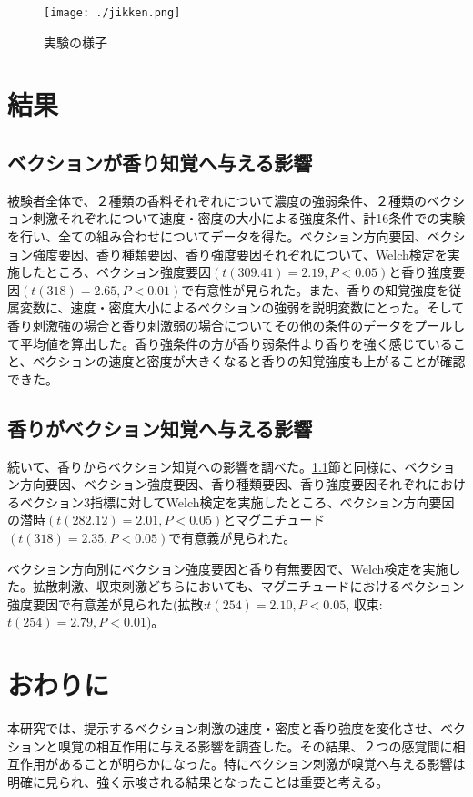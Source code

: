 \documentclass[uplatex]{jsarticle}   %
\begin{document}
\begin{figure}[htbp]
 \centering
 \texttt{[image: ./jikken.png]}
 \caption{実験の様子}\label{fig:jikken}
\end{figure}

\section{結果}
\subsection{ベクションが香り知覚へ与える影響}
\label{ベクションが香り知覚へ与える影響}
被験者全体で、２種類の香料それぞれについて濃度の強弱条件、２種類のベクション刺激それぞれについて速度・密度の大小による強度条件、計16条件での実験を行い、全ての組み合わせについてデータを得た。ベクション方向要因、ベクション強度要因、香り種類要因、香り強度要因それぞれについて、Welch検定を実施したところ、ベクション強度要因$(t(309.41)=2.19, P < 0.05)$と香り強度要因$(t(318)=2.65, P < 0.01)$で有意性が見られた。また、香りの知覚強度を従属変数に、速度・密度大小によるベクションの強弱を説明変数にとった。そして香り刺激強の場合と香り刺激弱の場合についてその他の条件のデータをプールして平均値を算出した。香り強条件の方が香り弱条件より香りを強く感じていること、ベクションの速度と密度が大きくなると香りの知覚強度も上がることが確認できた。

\subsection{香りがベクション知覚へ与える影響}
続いて、香りからベクション知覚への影響を調べた。\ref{ベクションが香り知覚へ与える影響}節と同様に、ベクション方向要因、ベクション強度要因、香り種類要因、香り強度要因それぞれにおけるベクション3指標に対してWelch検定を実施したところ、ベクション方向要因の潜時$(t(282.12)=2.01, P < 0.05)$とマグニチュード$(t(318)=2.35, P < 0.05)$で有意義が見られた。

ベクション方向別にベクション強度要因と香り有無要因で、Welch検定を実施した。拡散刺激、収束刺激どちらにおいても、マグニチュードにおけるベクション強度要因で有意差が見られた(拡散:$t(254)=2.10, P<0.05$, 収束:$t(254)=2.79, P<0.01$)。

\section{おわりに}
本研究では、提示するベクション刺激の速度・密度と香り強度を変化させ、ベクションと嗅覚の相互作用に与える影響を調査した。その結果、２つの感覚間に相互作用があることが明らかになった。特にベクション刺激が嗅覚へ与える影響は明確に見られ、強く示唆される結果となったことは重要と考える。
\end{document}
